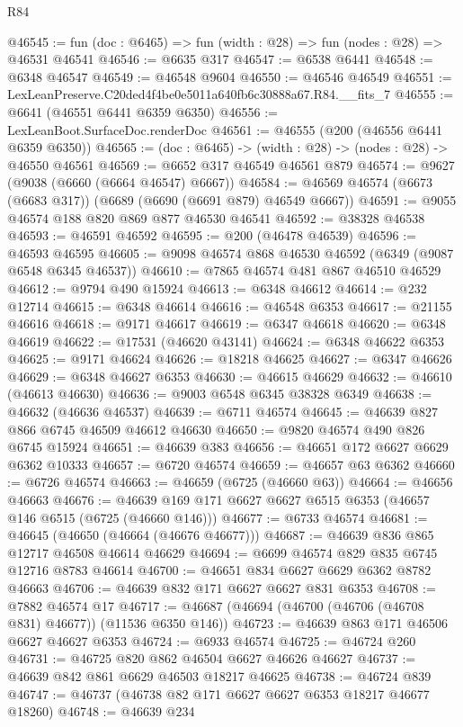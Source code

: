 \begin{lexlean}{R84}
\begin{coremodule}
@46545 := fun (doc : @6465) => fun (width : @28) => fun (nodes : @28) => @46531 @46541
@46546 := @6635 @317
@46547 := @6538 @6441
@46548 := @6348 @46547
@46549 := @46548 @9604
@46550 := @46546 @46549
@46551 := LexLeanPreserve.C20ded4f4be0e5011a640fb6c30888a67.R84.__fits_7
@46555 := @6641 (@46551 @6441 @6359 @6350)
@46556 := LexLeanBoot.SurfaceDoc.renderDoc
@46561 := @46555 (@200 (@46556 @6441 @6359 @6350))
@46565 := (doc : @6465) -> (width : @28) -> (nodes : @28) -> @46550 @46561
@46569 := @6652 @317 @46549 @46561 @879
@46574 := @9627 (@9038 (@6660 (@6664 @46547) @6667))
@46584 := @46569 @46574 (@6673 (@6683 @317)) (@6689 (@6690 (@6691 @879) @46549 @6667))
@46591 := @9055 @46574 @188 @820 @869 @877 @46530 @46541
@46592 := @38328 @46538
@46593 := @46591 @46592
@46595 := @200 (@46478 @46539)
@46596 := @46593 @46595
@46605 := @9098 @46574 @868 @46530 @46592 (@6349 (@9087 @6548 @6345 @46537))
@46610 := @7865 @46574 @481 @867 @46510 @46529
@46612 := @9794 @490 @15924
@46613 := @6348 @46612
@46614 := @232 @12714
@46615 := @6348 @46614
@46616 := @46548 @6353
@46617 := @21155 @46616
@46618 := @9171 @46617
@46619 := @6347 @46618
@46620 := @6348 @46619
@46622 := @17531 (@46620 @43141)
@46624 := @6348 @46622 @6353
@46625 := @9171 @46624
@46626 := @18218 @46625
@46627 := @6347 @46626
@46629 := @6348 @46627 @6353
@46630 := @46615 @46629
@46632 := @46610 (@46613 @46630)
@46636 := @9003 @6548 @6345 @38328 @6349
@46638 := @46632 (@46636 @46537)
@46639 := @6711 @46574
@46645 := @46639 @827 @866 @6745 @46509 @46612 @46630
@46650 := @9820 @46574 @490 @826 @6745 @15924
@46651 := @46639 @383
@46656 := @46651 @172 @6627 @6629 @6362 @10333
@46657 := @6720 @46574
@46659 := @46657 @63 @6362
@46660 := @6726 @46574
@46663 := @46659 (@6725 (@46660 @63))
@46664 := @46656 @46663
@46676 := @46639 @169 @171 @6627 @6627 @6515 @6353 (@46657 @146 @6515 (@6725 (@46660 @146)))
@46677 := @6733 @46574
@46681 := @46645 (@46650 (@46664 (@46676 @46677)))
@46687 := @46639 @836 @865 @12717 @46508 @46614 @46629
@46694 := @6699 @46574 @829 @835 @6745 @12716 @8783 @46614
@46700 := @46651 @834 @6627 @6629 @6362 @8782 @46663
@46706 := @46639 @832 @171 @6627 @6627 @831 @6353
@46708 := @7882 @46574 @17
@46717 := @46687 (@46694 (@46700 (@46706 (@46708 @831) @46677)) (@11536 @6350 @146))
@46723 := @46639 @863 @171 @46506 @6627 @46627 @6353
@46724 := @6933 @46574
@46725 := @46724 @260
@46731 := @46725 @820 @862 @46504 @6627 @46626 @46627
@46737 := @46639 @842 @861 @6629 @46503 @18217 @46625
@46738 := @46724 @839
@46747 := @46737 (@46738 @82 @171 @6627 @6627 @6353 @18217 @46677 @18260)
@46748 := @46639 @234

\end{coremodule}
\end{lexlean}
